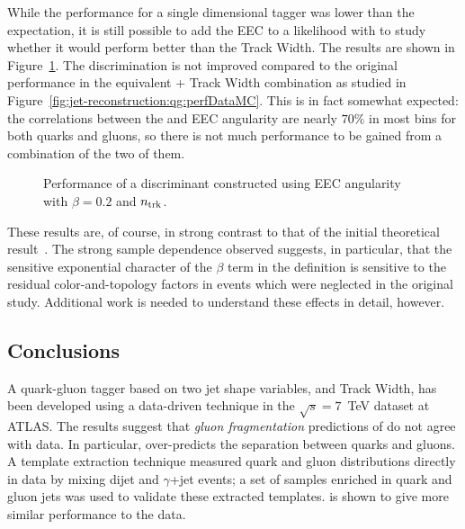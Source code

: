 While the performance for a single dimensional tagger was lower than the \Pythia expectation, it is still possible to add the EEC to a likelihood with \ntrk to study whether it would perform better than the Track Width. The results are shown in Figure~\ref{fig:jet-reconstruction:qg:eec_ntrk_perf}. The discrimination is not improved compared to the original performance in the equivalent \ntrk + Track Width combination as studied in Figure~\ref{fig:jet-reconstruction:qg:perfDataMC}. This is in fact somewhat expected: the correlations between the \ntrk and EEC angularity are nearly $70\%$ in most \pt bins for both quarks and gluons, so there is not much performance to be gained from a combination of the two of them. 

\begin{figure}[!h]
	\centering
	\caption{Performance of a discriminant constructed using EEC angularity with $\beta=0.2$ and $n_{\rm trk}$.
	\label{fig:jet-reconstruction:qg:eec_ntrk_perf}}
\end{figure}

These results are, of course, in strong contrast to that of the initial theoretical result~\cite{EEC}. The strong sample dependence observed suggests, in particular, that the sensitive exponential character of the $\beta$ term in the definition is sensitive to the residual color-and-topology factors in events which were neglected in the original study. Additional work is needed to understand these effects in detail, however.


\subsection{Conclusions}

A quark-gluon tagger based on two jet shape variables, \ntrk and Track Width, has been developed using a data-driven technique in the $\sqrt{s} = 7$~TeV dataset at ATLAS. The results suggest that \textit{gluon fragmentation} predictions of \Pythia do not agree with data. In particular, \Pythia over-predicts the separation between quarks and gluons. A template extraction technique measured quark and gluon distributions directly in data by mixing dijet and $\gamma$+jet events; a set of samples enriched in quark and gluon jets was used to validate these extracted templates. \Herwigpp is shown to give more similar performance to the data.

